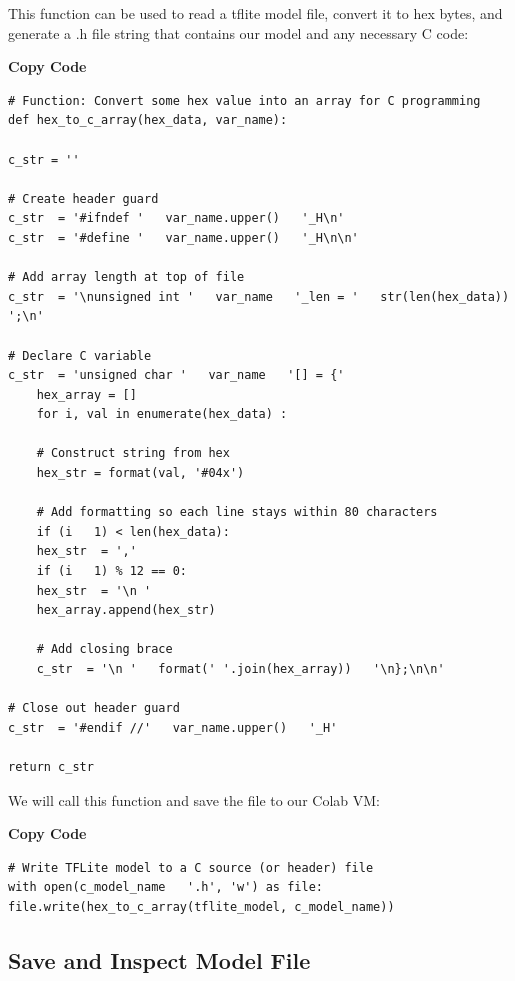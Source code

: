 This function can be used to read a tflite model file, convert it to hex bytes, and generate a .h file string that contains our model and any necessary C code:

\medskip

\textbf{\medskip \textbf{Copy Code}}

\begin{lstlisting}
# Function: Convert some hex value into an array for C programming
def hex_to_c_array(hex_data, var_name):

c_str = ''

# Create header guard
c_str  = '#ifndef '   var_name.upper()   '_H\n'
c_str  = '#define '   var_name.upper()   '_H\n\n'

# Add array length at top of file
c_str  = '\nunsigned int '   var_name   '_len = '   str(len(hex_data))   ';\n'

# Declare C variable
c_str  = 'unsigned char '   var_name   '[] = {'
    hex_array = []
    for i, val in enumerate(hex_data) :
    
    # Construct string from hex
    hex_str = format(val, '#04x')
    
    # Add formatting so each line stays within 80 characters
    if (i   1) < len(hex_data):
    hex_str  = ','
    if (i   1) % 12 == 0:
    hex_str  = '\n '
    hex_array.append(hex_str)
    
    # Add closing brace
    c_str  = '\n '   format(' '.join(hex_array))   '\n};\n\n'

# Close out header guard
c_str  = '#endif //'   var_name.upper()   '_H'

return c_str
\end{lstlisting}


We will call this function and save the  file to our Colab VM:



\medskip

 \textbf{\medskip \textbf{Copy Code}}
 
\begin{lstlisting}
# Write TFLite model to a C source (or header) file
with open(c_model_name   '.h', 'w') as file:
file.write(hex_to_c_array(tflite_model, c_model_name))
\end{lstlisting}


\subsection{Save and Inspect Model File}

